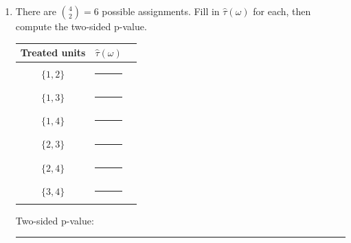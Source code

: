 \documentclass[12pt]{article}
\begin{document}
\begin{enumerate}
\begin{enumerate}[label=(\alph*)]
    \vspace{0.3cm}

    \item There are $\binom{4}{2} = 6$ possible assignments. Fill in $\hat\tau(\omega)$ for each, then compute the two-sided p-value.

    \begin{center}
    {\renewcommand{\arraystretch}{1.6}
    \begin{tabular}{c c c}
    Treated units & $\hat\tau(\omega)$ \\
    \hline
    $\{1,2\}$ & \rule{1.5cm}{0.4pt} \\
    $\{1,3\}$ & \rule{1.5cm}{0.4pt} \\
    $\{1,4\}$ & \rule{1.5cm}{0.4pt} \\
    $\{2,3\}$ & \rule{1.5cm}{0.4pt} \\
    $\{2,4\}$ & \rule{1.5cm}{0.4pt} \\
    $\{3,4\}$ & \rule{1.5cm}{0.4pt} \\
    \end{tabular}}
    \end{center}
	
	\vspace{0.5cm}

    Two-sided p-value: \rule{3cm}{0.4pt}

\end{enumerate}

%
%
%
%
%
%


\end{enumerate}
\end{document}
